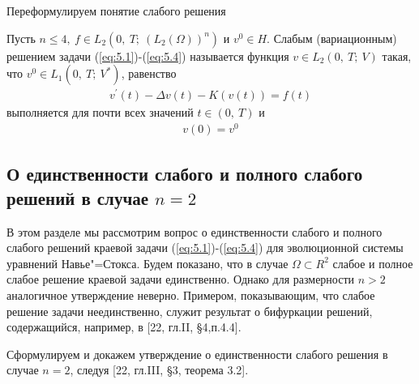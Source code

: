 Переформулируем понятие слабого решения
\begin{definition}
    Пусть $n \le 4, \ f \in L_2(0, \ T; \ (L_2(\Omega))^n)$ и $v^0 \in H$. Слабым (вариационным) решением задачи (\ref{eq:5.1})-(\ref{eq:5.4}) называется функция
    $v \in L_2(0, \ T; \ V)$ такая, что $v^0 \in L_1(0, \ T; \ V^\ast)$, равенство
    \begin{equation}\label{eq:5.11}
        \begin{gathered}
            v^\prime(t) - \Delta v(t) - K(v(t)) = f(t)
        \end{gathered}
    \end{equation}
    выполняется для почти всех значений $t \in (0, \ T)$ и
    \begin{equation}\label{eq:5.12}
        \begin{gathered}
            v(0) = v^0
        \end{gathered}
    \end{equation}
\end{definition}


\subsection {О единственности слабого и полного слабого решений в случае $n = 2$}
В этом разделе мы рассмотрим вопрос о единственности слабого и полного слабого решений краевой задачи (\ref{eq:5.1})-(\ref{eq:5.4}) для эволюционной
системы уравнений Навье"=Стокса. Будем показано, что в случае $\Omega \subset R^2$ слабое и полное слабое решение краевой задачи единственно.
Однако для размерности $n > 2$ аналогичное утверждение неверно. Примером, показывающим, что слабое решение задачи неединственно, служит результат
о бифуркации решений, содержащийся, например, в [22, гл.II, \S 4,п.4.4].

Сформулируем и докажем утверждение о единственности слабого решения в случае $n = 2$, следуя [22, гл.III, \S 3, теорема 3.2].

